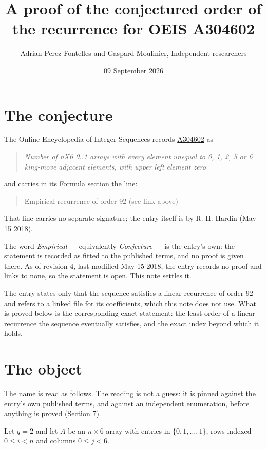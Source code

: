 \documentclass[11pt]{article}
\title{A proof of the conjectured order of the recurrence for OEIS A304602}
\author{Adrian Perez Fontelles and Gaspard Moulinier, Independent researchers}
\date{09 September 2026}
\theoremstyle{definition}
\begin{document}
\maketitle
\section{The conjecture}

The Online Encyclopedia of Integer Sequences records \href{https://oeis.org/A304602}{A304602} as

\begin{quote}\itshape Number of nX6 0..1 arrays with every element unequal to 0, 1, 2, 5 or 6 king-move adjacent elements, with upper left element zero\end{quote}

and carries in its Formula section the line:

\begin{quote}\ttfamily Empirical recurrence of order 92 (see link above)\end{quote}

That line carries no separate signature; the entry itself is by R. H. Hardin (May 15 2018).

The word {\itshape Empirical} --- equivalently {\itshape Conjecture} --- is the entry's own: the statement is recorded as fitted to the published terms, and no proof is given there. As of revision 4, last modified May 15 2018, the entry records no proof and links to none, so the statement is open. This note settles it.

The entry states only that the sequence satisfies a linear recurrence of order $92$ and refers to a linked file for its coefficients, which this note does not use. What is proved below is the corresponding exact statement: the least order of a linear recurrence the sequence eventually satisfies, and the exact index beyond which it holds.

\section{The object}

The name is read as follows. The reading is not a guess: it is pinned against the entry's own published terms, and against an independent enumeration, before anything is proved (Section 7).

Let $q = 2$ and let $A$ be an $n \times 6$ array with entries in $\{0,1,\dots,1\}$, rows indexed $0 \le i < n$ and columns $0 \le j < 6$.
\end{document}
